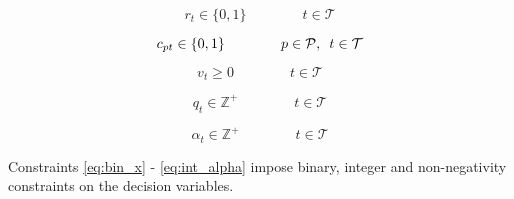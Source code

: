 \begin{equation} \label{eq:free_hit_bin_r}
    r_{t} \in \{0,1\} \qquad\qquad  t \in \mathcal{T}
\end{equation}

\begin{equation} \label{eq:triple_captain_bin_c}
    c_{pt} \in \{0,1\} \qquad\qquad p \in \mathcal{P}, \enskip t \in \mathcal{T} 
\end{equation}

\begin{equation} \label{eq:nonn_v}
    v_{t} \geq 0 \qquad\qquad t \in \mathcal{T} 
\end{equation}

\begin{equation} \label{eq:int_q}
    q_{t} \in \mathbb{Z}^{+}  \qquad\qquad t \in \mathcal{T}
\end{equation}

\begin{equation} \label{eq:int_alpha}
    \alpha_{t} \in \mathbb{Z}^{+}  \qquad\qquad t \in \mathcal{T}
\end{equation}

Constraints \eqref{eq:bin_x} - \eqref{eq:int_alpha} impose binary, integer and non-negativity constraints on the decision variables.



